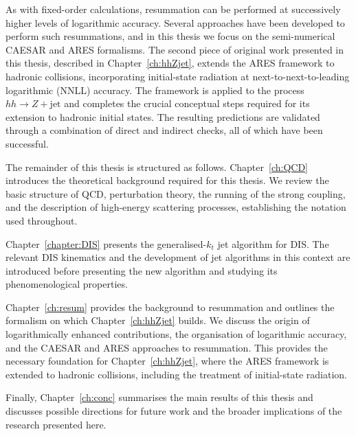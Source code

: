 As with fixed-order calculations, resummation can be performed at successively
higher levels of logarithmic accuracy. Several approaches have been developed to
perform such resummations, and in this thesis we focus on the semi-numerical
\textsc{CAESAR} and \textsc{ARES} formalisms. The second piece of original work
presented in this thesis, described in Chapter~\ref{ch:hhZjet}, extends the
\textsc{ARES} framework to hadronic collisions, incorporating initial-state
radiation at next-to-next-to-leading logarithmic (NNLL) accuracy. The framework
is applied to the process $hh\to Z+\mathrm{jet}$ and completes the crucial conceptual
steps required for its extension to hadronic initial states. The resulting
predictions are validated through a combination of direct and indirect checks,
all of which have been successful.

The remainder of this thesis is structured as follows. Chapter~\ref{ch:QCD}
introduces the theoretical background required for this thesis.
We review the basic structure of QCD, perturbation theory, the running of the
strong coupling, and the description of high-energy scattering processes,
establishing the notation used throughout.

Chapter~\ref{chapter:DIS} presents the generalised-$k_t$ jet algorithm for DIS.
The relevant DIS kinematics and the development of jet algorithms in this
context are introduced before presenting the new algorithm and studying its
phenomenological properties.

Chapter~\ref{ch:resum} provides the background to resummation and
outlines the formalism on which Chapter~\ref{ch:hhZjet} builds.
We discuss the origin of logarithmically enhanced
contributions, the organisation of logarithmic accuracy, and the
\textsc{CAESAR} and \textsc{ARES} approaches to resummation. This provides the
necessary foundation for Chapter~\ref{ch:hhZjet}, where the \textsc{ARES} framework
is extended to hadronic collisions, including the treatment of initial-state
radiation.

Finally, Chapter~\ref{ch:conc} summarises the main results of this thesis and
discusses possible directions for future work and the broader implications of
the research presented here.